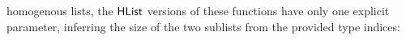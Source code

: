 \documentclass[sigplan]{acmart}%
\begin{document}
homogenous lists, the $\AgdaDatatype{HList}$ versions of these functions 
have only one explicit parameter, inferring the size of the two sublists from the
provided type indices:\nopagebreak
\begin{code}
\>[2]\AgdaSpace{}%
\AgdaSymbol{:}\AgdaSpace{}%
\AgdaSpace{}%
\AgdaSymbol{\}}\AgdaSpace{}%
\AgdaSpace{}%
\AgdaSpace{}%
\AgdaSymbol{(}\AgdaSpace{}%
\AgdaOperator{\AgdaFunction{++}}\AgdaSpace{}%
\AgdaSymbol{)}\AgdaSpace{}%
\AgdaSpace{}%
\AgdaSpace{}%
\<%
\\
%
\>[2]\AgdaSpace{}%
\AgdaSymbol{\{}\AgdaInductiveConstructor{[]}\AgdaSymbol{\}}\AgdaSpace{}%
\AgdaSpace{}%
\AgdaSymbol{=}\AgdaSpace{}%
\AgdaInductiveConstructor{[]}\<%
\\
%
\>[2]\AgdaSpace{}%
\AgdaSymbol{\{}\AgdaSpace{}%
\AgdaSpace{}%
\AgdaSymbol{\}}\AgdaSpace{}%
\AgdaSymbol{(}\AgdaSpace{}%
\AgdaSpace{}%
\AgdaSymbol{)}\AgdaSpace{}%
\AgdaSymbol{=}\AgdaSpace{}%
\AgdaSpace{}%
\AgdaSpace{}%
\AgdaSpace{}%
\AgdaSymbol{\{}\AgdaSymbol{\}}\AgdaSpace{}%
\<%
\\
%
\\[\AgdaEmptyExtraSkip]%
%
\>[2]\AgdaSpace{}%
\AgdaSymbol{:}\AgdaSpace{}%
\AgdaSpace{}%
\AgdaSymbol{\}}\AgdaSpace{}%
\AgdaSpace{}%
\AgdaSpace{}%
\AgdaSymbol{(}\AgdaSpace{}%
\AgdaOperator{\AgdaFunction{++}}\AgdaSpace{}%
\AgdaSymbol{)}\AgdaSpace{}%
\AgdaSpace{}%
\AgdaSpace{}%
\<%
\\
%
\>[2]\AgdaSpace{}%
\AgdaSymbol{\{}\AgdaInductiveConstructor{[]}\AgdaSymbol{\}}\AgdaSpace{}%
\AgdaSpace{}%
\AgdaSymbol{=}\AgdaSpace{}%
\<%
\\
%
\>[2]\AgdaSpace{}%
\AgdaSymbol{\{}\AgdaSpace{}%
\AgdaSpace{}%
\AgdaSymbol{\}}\AgdaSpace{}%
\AgdaSymbol{(}\AgdaSpace{}%
\AgdaSpace{}%
\AgdaSymbol{)}\AgdaSpace{}%
\AgdaSymbol{=}\AgdaSpace{}%
\AgdaSpace{}%
\AgdaSymbol{\{}\AgdaSymbol{\}}\AgdaSpace{}%
\<%
\end{code}
\end{document}
